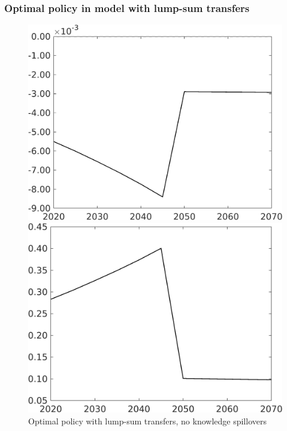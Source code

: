 \subsubsection{Optimal policy in model with lump-sum transfers}\label{app:TLS}
\begin{figure}[h!!!]
	\centering
	\caption{Optimal policy with lump-sum transfers, no knowledge spillovers
	}\label{fig:opt_TLs_noknow}
	\begin{minipage}[]{0.32\textwidth}
		\includegraphics[width=1\textwidth]{../../codding_model/own_basedOnFried/optimalPol_010922_revision/figures/all_13Sept22_Tplus30/taul_OPT_COMPtaul_regime4_spillover0_knspil1_noskill0_sep0_xgrowth0_PV1_etaa0.79_lgd0.png}
	\end{minipage}
	\begin{minipage}[]{0.32\textwidth}
		\includegraphics[width=1\textwidth]{../../codding_model/own_basedOnFried/optimalPol_010922_revision/figures/all_13Sept22_Tplus30/tauf_OPT_COMPtaulPer_regime4_spillover0_knspil1_noskill0_sep0_xgrowth0_PV1_etaa0.79.png}

\end{minipage}
\end{figure}
